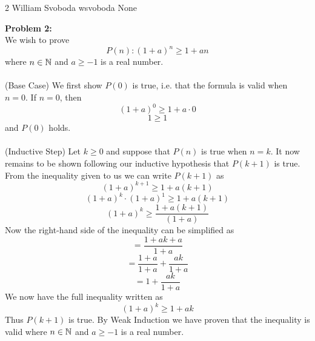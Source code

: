 \documentclass[12pt,letterpaper]{cos340hw}
\begin{document}
           {2}            %
           {William Svoboda}  %
           {wsvoboda}   %
           {None} 




\noindent\textbf{Problem 2:}\\
We wish to prove
$$P(n): (1+a)^n\ge1+an$$
where $n\in{\ensuremath{{\mathbb N}}}$ and $a\ge-1$ is a real number.\\\\
(Base Case) We first show $P(0)$ is true, i.e. that the formula is valid when
$n=0$. If $n=0$, then
$$(1+a)^0\ge1+a\cdot0$$
$$1\ge1$$
and $P(0)$ holds.\\\\
(Inductive Step) Let $k\ge0$ and suppose that $P(n)$ is true when $n=k$. It now remains to be shown 
following our inductive hypothesis that $P(k+1)$ is true. \\
From the inequality given to us we can write $P(k+1)$ as
$$(1+a)^{k+1}\ge1+a(k+1)$$
$$(1+a)^k\cdot(1+a)^1\ge1+a(k+1)$$
$$(1+a)^k\ge\frac{1+a(k+1)}{(1+a)}$$
Now the right-hand side of the inequality can be simplified as
$$=\frac{1+ak+a}{1+a}$$
$$=\frac{1+a}{1+a}+\frac{ak}{1+a}$$
$$=1+\frac{ak}{1+a}$$
We now have the full inequality written as
$$(1+a)^k\ge1+ak$$
Thus $P(k+1)$ is true. By Weak Induction we have proven that the inequality is valid where 
$n\in{\ensuremath{{\mathbb N}}}$ and $a\ge-1$ is a real number.

\end{document}
